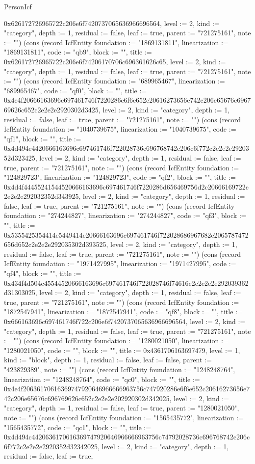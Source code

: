 \begin{lexlean}{PersonIcf}
\begin{semanticmodule}
{0x626172726965722c206e6f7420737065636966696564, level := 2, kind := "category", depth := 1, residual := false, leaf := true, parent := "721275161", note := ""}) (cons (record IcfEntity {foundation := "1869131811", linearization := "1869131811", code := "qb9", block := "", title := 0x626172726965722c206e6f74206170706c696361626c65, level := 2, kind := "category", depth := 1, residual := false, leaf := true, parent := "721275161", note := ""}) (cons (record IcfEntity {foundation := "689965467", linearization := "689965467", code := "qf0", block := "", title := 0x4e4f20666163696c697461746f7220286e6f6e652c20616273656e742c206e65676c696769626c652c2e2e2e2920302d3425, level := 2, kind := "category", depth := 1, residual := false, leaf := true, parent := "721275161", note := ""}) (cons (record IcfEntity {foundation := "1040739675", linearization := "1040739675", code := "qf1", block := "", title := 0x4d494c4420666163696c697461746f722028736c696768742c206c6f772c2e2e2e2920352d323425, level := 2, kind := "category", depth := 1, residual := false, leaf := true, parent := "721275161", note := ""}) (cons (record IcfEntity {foundation := "124829723", linearization := "124829723", code := "qf2", block := "", title := 0x4d4f44455241544520666163696c697461746f7220286d656469756d2c20666169722c2e2e2e292032352d343925, level := 2, kind := "category", depth := 1, residual := false, leaf := true, parent := "721275161", note := ""}) (cons (record IcfEntity {foundation := "274244827", linearization := "274244827", code := "qf3", block := "", title := 0x5355425354414e5449414c20666163696c697461746f722028686967682c2065787472656d652c2e2e2e292035302d393525, level := 2, kind := "category", depth := 1, residual := false, leaf := true, parent := "721275161", note := ""}) (cons (record IcfEntity {foundation := "1971427995", linearization := "1971427995", code := "qf4", block := "", title := 0x434f4d504c45544520666163696c697461746f722028746f74616c2c2e2e2e292039362d31303025, level := 2, kind := "category", depth := 1, residual := false, leaf := true, parent := "721275161", note := ""}) (cons (record IcfEntity {foundation := "1872547941", linearization := "1872547941", code := "qf8", block := "", title := 0x666163696c697461746f722c206e6f7420737065636966696564, level := 2, kind := "category", depth := 1, residual := false, leaf := true, parent := "721275161", note := ""}) (cons (record IcfEntity {foundation := "1280021050", linearization := "1280021050", code := "", block := "", title := 0x4361706163697479, level := 1, kind := "block", depth := 1, residual := false, leaf := false, parent := "423829389", note := ""}) (cons (record IcfEntity {foundation := "1248248764", linearization := "1248248764", code := "qc0", block := "", title := 0x4e4f20636170616369747920646966666963756c747920286e6f6e652c20616273656e742c206e65676c696769626c652c2e2e2e202920302d342025, level := 2, kind := "category", depth := 1, residual := false, leaf := true, parent := "1280021050", note := ""}) (cons (record IcfEntity {foundation := "1565435772", linearization := "1565435772", code := "qc1", block := "", title := 0x4d494c4420636170616369747920646966666963756c74792028736c696768742c206c6f772c2e2e2e2920352d32342025, level := 2, kind := "category", depth := 1, residual := false, leaf := true, }
\end{semanticmodule}
\end{lexlean}
